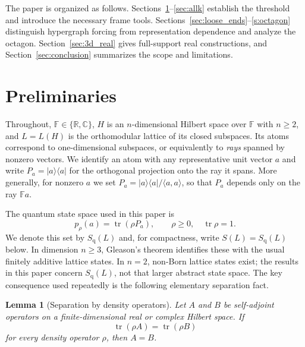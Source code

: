 \documentclass[
  twocolumn,
  aps,
  pra,
  floatfix,
  amsmath,amssymb,
  longbibliography
]{revtex4-2}
\newtheorem{lemma}[theorem]{Lemma}
\theoremstyle{definition}
\theoremstyle{remark}
\begin{document}
The paper is organized as follows.  Sections~\ref{sec:preliminaries}--\ref{sec:allk}
establish the threshold and introduce the necessary frame tools.
Sections~\ref{sec:loose_ends}--\ref{s:octagon} distinguish hypergraph
forcing from representation dependence and analyze the octagon.
Section~\ref{sec:3d_real} gives full-support real constructions, and
Section~\ref{sec:conclusion} summarizes the scope and limitations.

\section{Preliminaries}
\label{sec:preliminaries}

Throughout, $\mathbb F\in\{\mathbb R,\mathbb C\}$, $H$ is an
$n$-dimensional Hilbert space over $\mathbb F$ with $n\ge2$, and
$L=L(H)$ is the orthomodular lattice of its closed
subspaces.  Its atoms correspond to one-dimensional subspaces, or
equivalently to \emph{rays} spanned by nonzero vectors.  We identify
an atom with any representative unit vector $a$ and write
$P_a=|a\rangle\langle a|$ for the orthogonal projection onto the ray
it spans.  More generally, for nonzero $a$ we set $P_a=|a\rangle\langle
a|/\langle a,a\rangle$, so that $P_a$ depends only on the ray
$\mathbb F a$.

The quantum state space used in this paper is
\begin{equation}
  p_\rho(a)=\operatorname{tr}(\rho P_a),\qquad
  \rho\ge 0,\quad\operatorname{tr}\rho=1.
  \label{eq:gleason}
\end{equation}
We denote this set by $S_{\mathrm q}(L)$ and, for compactness, write
$S(L)=S_{\mathrm q}(L)$ below.  In dimension $n\ge3$, Gleason's theorem
\cite{Gleason} identifies these with the usual finitely additive lattice
states.  In $n=2$, non-Born lattice states exist; the results in this
paper concern $S_{\mathrm q}(L)$, not that larger abstract state space.
The key consequence used repeatedly is the following elementary
separation fact.

\begin{lemma}[Separation by density operators]\label{lem:density_separation}
Let $A$ and $B$ be self-adjoint operators on a finite-dimensional real
or complex Hilbert space.  If
\[
  \operatorname{tr}(\rho A)=\operatorname{tr}(\rho B)
\]
for every density operator $\rho$, then $A=B$.
\end{lemma}
\end{document}
